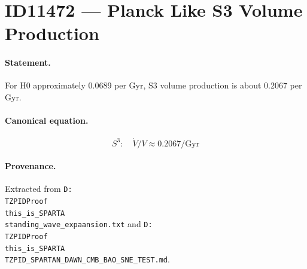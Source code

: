 \section*{ID11472 --- Planck Like S3 Volume Production}

\paragraph{Statement.}
For H0 approximately 0.0689 per Gyr, S3 volume production is about 0.2067 per Gyr.

\paragraph{Canonical equation.}
\[
S^3:\quad\dot V/V\approx0.2067/\mathrm{Gyr}
\]

\paragraph{Provenance.}
Extracted from \texttt{D:\\TZPIDProof\\this\_is\_SPARTA\\standing\_wave\_expaansion.txt} and \texttt{D:\\TZPIDProof\\this\_is\_SPARTA\\TZPID\_SPARTAN\_DAWN\_CMB\_BAO\_SNE\_TEST.md}.
